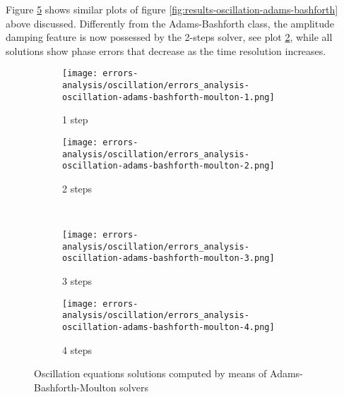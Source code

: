 Figure \ref{fig:results-oscillation-adams-bashforth-moulton} shows similar plots of figure \ref{fig:results-oscillation-adams-bashforth} above discussed. Differently from the Adams-Bashforth class, the amplitude damping feature is now possessed by the 2-steps solver, see plot \ref{fig:results-oscillation-adams-bashforth-moulton-2}, while all solutions show phase errors that decrease as the time resolution increases.

\begin{figure}[!ht]
  \centering
  \begin{subfigure}[b]{0.45\textwidth}
    \centering
    \texttt{[image: errors-analysis/oscillation/errors\_analysis-oscillation-adams-bashforth-moulton-1.png]}
    \caption{1 step}\label{fig:results-oscillation-adams-bashforth-moulton-1}
  \end{subfigure}\quad%
  \begin{subfigure}[b]{0.45\textwidth}
    \centering
    \texttt{[image: errors-analysis/oscillation/errors\_analysis-oscillation-adams-bashforth-moulton-2.png]}
    \caption{2 steps}\label{fig:results-oscillation-adams-bashforth-moulton-2}
  \end{subfigure}\\
  \begin{subfigure}[b]{0.45\textwidth}
    \centering
    \texttt{[image: errors-analysis/oscillation/errors\_analysis-oscillation-adams-bashforth-moulton-3.png]}
    \caption{3 steps}\label{fig:results-oscillation-adams-bashforth-moulton-3}
  \end{subfigure}\quad%
  \begin{subfigure}[b]{0.45\textwidth}
    \centering
    \texttt{[image: errors-analysis/oscillation/errors\_analysis-oscillation-adams-bashforth-moulton-4.png]}
    \caption{4 steps}\label{fig:results-oscillation-adams-bashforth-moulton-4}
  \end{subfigure}
  \caption{Oscillation equations solutions computed by means of Adams-Bashforth-Moulton solvers}\label{fig:results-oscillation-adams-bashforth-moulton}
\end{figure}
\clearpage

